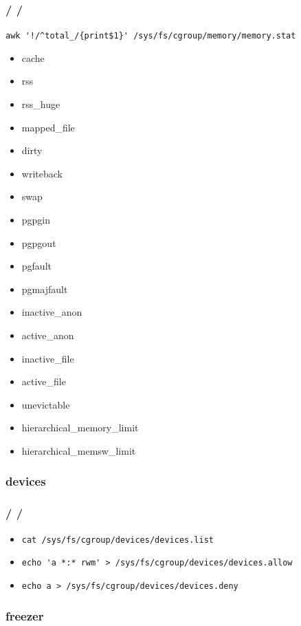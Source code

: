 \documentclass{beamer}
\newcommand{\autotitle}
{\frametitle{
    \secname
    \ifx\insertsubsection\empty
    \else
        /\subsecname
        \ifx\insertsubsubsection\empty\else/\subsubsecname\fi
    \fi}}
\begin{document}
\begin{frame}[fragile]
    \autotitle
    \verb|awk '!/^total_/{print$1}' /sys/fs/cgroup/memory/memory.stat|
    \begin{multicols}{2}
        \begin{itemize}
            \item cache
            \item rss
            \item rss\_huge
            \item mapped\_file
            \item dirty
            \item writeback
            \item swap
            \item pgpgin
            \item pgpgout
            \item pgfault
            \item pgmajfault
            \item inactive\_anon
            \item active\_anon
            \item inactive\_file
            \item active\_file
            \item unevictable
            \item hierarchical\_memory\_limit
            \item hierarchical\_memsw\_limit
        \end{itemize}
    \end{multicols}
\end{frame}

\subsubsection{devices}

\begin{frame}[fragile]
    \autotitle
    \begin{itemize}
        \item \verb|cat /sys/fs/cgroup/devices/devices.list|
        \item \verb|echo 'a *:* rwm' > /sys/fs/cgroup/devices/devices.allow|
        \item \verb|echo a > /sys/fs/cgroup/devices/devices.deny|
    \end{itemize}
\end{frame}

\subsubsection{freezer}
\end{document}
